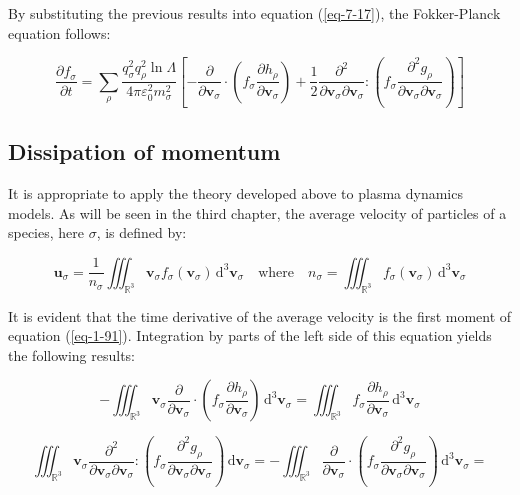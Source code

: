 By substituting the previous results into equation (\ref{eq-7-17}), the Fokker-Planck equation follows:

\begin{equation}
    \label{eq-1-91}
    \frac{\partial f_\sigma}{\partial t}=\sum_{\rho}\frac{q_\sigma^2q_\rho^2\ln{\Lambda}}{4\pi\varepsilon_0^2m_\sigma^2}\left[-\frac{\partial}{\partial\mathbf{v}_\sigma}\cdot\left(f_\sigma\frac{\partial h_\rho}{\partial\mathbf{v}_\sigma}\right)+\frac{1}{2}\frac{\partial^2}{\partial\mathbf{v}_\sigma\partial\mathbf{v}_\sigma}:\left(f_\sigma\frac{\partial^2g_\rho}{\partial\mathbf{v}_\sigma\partial\mathbf{v}_\sigma}\right)\right]
\end{equation}

\subsection{Dissipation of momentum}

It is appropriate to apply the theory developed above to plasma dynamics models. As will be seen in the third chapter, the average velocity of particles of a species, here $\sigma$, is defined by:

\begin{equation}
    \mathbf{u}_\sigma=\frac{1}{n_\sigma}\iiint_{\mathbb{R}^3}\mathbf{v}_\sigma f_\sigma(\mathbf{v}_\sigma)\,\mathrm{d}^3\mathbf{v}_\sigma\quad\text{where}\quad n_\sigma=\iiint_{\mathbb{R}^3}f_\sigma(\mathbf{v}_\sigma)\,\mathrm{d}^3\mathbf{v}_\sigma
\end{equation}

It is evident that the time derivative of the average velocity is the first moment of equation (\ref{eq-1-91}). Integration by parts of the left side of this equation yields the following results:

\begin{equation}
    -\iiint_{\mathbb{R}^3}\mathbf{v}_\sigma\frac{\partial}{\partial\mathbf{v}_\sigma}\cdot\left(f_\sigma\frac{\partial h_\rho}{\partial\mathbf{v}_\sigma}\right)\,\mathrm{d}^3\mathbf{v}_\sigma=\iiint_{\mathbb{R}^3}f_\sigma\frac{\partial h_\rho}{\partial\mathbf{v}_\sigma}\,\mathrm{d}^3\mathbf{v}_\sigma
\end{equation}

\begin{equation*}
    \iiint_{\mathbb{R}^3}\mathbf{v}_\sigma\frac{\partial^2}{\partial\mathbf{v}_\sigma\partial\mathbf{v}_\sigma}:\left(f_\sigma\frac{\partial^2g_\rho}{\partial\mathbf{v}_\sigma\partial\mathbf{v}_\sigma}\right)\,\mathrm{d}\mathbf{v}_\sigma=-\iiint_{\mathbb{R}^3}\frac{\partial}{\partial\mathbf{v}_\sigma}\cdot\left(f_\sigma\frac{\partial^2g_\rho}{\partial\mathbf{v}_\sigma\partial\mathbf{v}_\sigma}\right)\,\mathrm{d}^3\mathbf{v}_\sigma=
\end{equation*}

